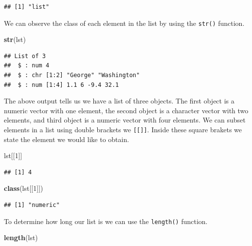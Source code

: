 \documentclass[
]{book}
\newenvironment{Shaded}{\begin{snugshade}}{\end{snugshade}}
\newcommand{\DecValTok}[1]{\textcolor[rgb]{0.00,0.00,0.81}{#1}}
\newcommand{\KeywordTok}[1]{\textcolor[rgb]{0.13,0.29,0.53}{\textbf{#1}}}
\newcommand{\NormalTok}[1]{#1}
\begin{document}
\begin{verbatim}
## [1] "list"
\end{verbatim}

We can observe the class of each element in the list by using the \texttt{str()} function.

\begin{Shaded}
\begin{Highlighting}[]
\KeywordTok{str}\NormalTok{(lst)}
\end{Highlighting}
\end{Shaded}

\begin{verbatim}
## List of 3
##  $ : num 4
##  $ : chr [1:2] "George" "Washington"
##  $ : num [1:4] 1.1 6 -9.4 32.1
\end{verbatim}

The above output tells us we have a list of three objects. The first object is a numeric vector with one element, the second object is a character vector with two elements, and third object is a numeric vector with four elements. We can subset elements in a list using double brackets we \texttt{{[}{[}{]}{]}}. Inside these square brakets we state the element we would like to obtain.

\begin{Shaded}
\begin{Highlighting}[]
\NormalTok{lst[[}\DecValTok{1}\NormalTok{]]}
\end{Highlighting}
\end{Shaded}

\begin{verbatim}
## [1] 4
\end{verbatim}

\begin{Shaded}
\begin{Highlighting}[]
\KeywordTok{class}\NormalTok{(lst[[}\DecValTok{1}\NormalTok{]])}
\end{Highlighting}
\end{Shaded}

\begin{verbatim}
## [1] "numeric"
\end{verbatim}

To determine how long our list is we can use the \texttt{length()} function.

\begin{Shaded}
\begin{Highlighting}[]
\KeywordTok{length}\NormalTok{(lst)}
\end{Highlighting}
\end{Shaded}
\end{document}
